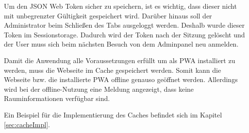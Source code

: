 
Um den JSON Web Token sicher zu speichern, ist es wichtig, dass dieser nicht mit unbegrenzter Gültigkeit gespeichert wird. Darüber hinaus soll der Administrator beim Schließen des Tabs ausgeloggt werden. Deshalb wurde dieser Token im Sessionstorage. Dadurch wird der Token nach der Sitzung gelöscht und der User muss sich beim nächsten Besuch von dem Adminpanel neu anmelden.


Damit die Anwendung alle Voraussetzungen erfüllt um als PWA installiert zu werden, muss die Webseite im Cache gespeichert werden. Somit kann die Webseite bzw. die installierte PWA offline genauso geöffnet werden. Allerdings wird bei der offline-Nutzung eine Meldung angezeigt, dass keine Rauminformationen verfügbar sind.

Ein Beispiel für die Implementierung des Caches befindet sich im Kapitel \ref{sec:cacheImpl}.
 